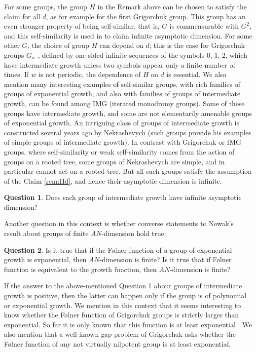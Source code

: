 \documentclass{amsart}
\numberwithin{figure}{section}
\theoremstyle{plain}
\theoremstyle{definition}
\newtheorem{question}{Question}
\begin{document}
For some groups, the group $H$ in the Remark above can be chosen to satisfy the claim for all $d$, as for example for the first Grigorchuk group. This group has an even stronger property of being self-similar, that is, $G$ is commensurable with $G^2$, and this self-similarity is used in \cite{smith} to claim infinite asymptotic dimension.
For some other $G$, the choice of group $H$ can depend on $d$; this is the case
for Grigorchuk groups $G_w$ \cite{grigorchukdegrees}, defined by one-sided infinite sequences of the symbols $0$, $1$, $2$, which 
have intermediate growth unless two symbols appear only a finite number of times. If $w$ is not periodic, the dependence of $H$ on $d$ is essential.
We also mention many interesting examples of self-similar groups, with rich families of groups of exponential growth, and also with families of groups of intermediate growth, can be found among IMG (iterated monodromy groups). Some of these groups have intermediate growth, and some are not elementarily amenable groups of exponential growth.
An intriguing class of groups of intermediate growth is constructed several years ago by Nekrashevych  \cite{nekrashevych} (such groups provide
his examples of simple groups of intermediate growth).
In contrast with Grigorchuk or IMG groups, where self-similarity or weak self-similarity comes from the action of
groups on a rooted tree, some groups of Nekrashevych are
simple, and in particular cannot act on a rooted tree.
But all such groups satisfy the assumption of the Claim \ref{rem:Hd},  and hence their  asymptotic dimension is infinite.


\begin{question} Does each group of intermediate growth have infinite asymptotic dimension?
\end{question}

Another question in this context is whether converse statements to Nowak's result
about groups of finite $AN$-dimension hold true:
\begin{question}
	Is it true that if the F{\o}lner function of a group of exponential growth  is exponential, then $AN$-dimension is finite?
    Is it true that if F{\o}lner function is equivalent to the growth function, then $AN$-dimension is finite?
\end{question}

If the answer to the above-mentioned Question 1 about groups of intermediate growth  is positive, then the latter can happen only if the group is of polynomial or exponential growth. We mention in this context that it seems interesting to know whether 
the  F{\o}lner function of Grigorchuk groups is strictly larger than exponential. So far it is only known that this function is  at least exponential \cite{erschlerzheng}. We also mention that a well-known gap problem of Grigorchuk asks whether the F{\o}lner function of any not virtually nilpotent group is at least exponential.
\end{document}

